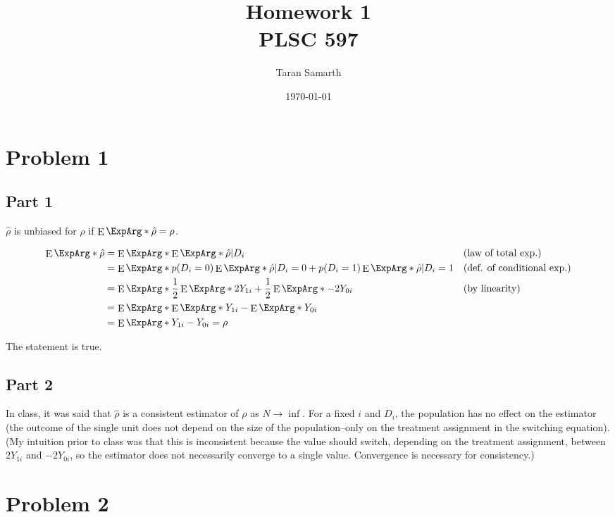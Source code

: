 \documentclass[12pt]{article}
\DeclareMathOperator{\ExpOp}{E}
\newcommand{\E}{\ExpOp\ExpArg*}
\begin{document}
\title{Homework 1 \\
        \large PLSC 597}

\author{Taran Samarth}
\date{\today}
\maketitle

\onehalfspacing

\section*{Problem 1}

\subsection*{Part 1}

$\hat{\rho}$ is unbiased for $\rho$ if $\E{\hat{\rho}} = \rho$.

\begin{align*}
\E{\hat{\rho}} & = \E{\E{\hat{\rho} | D_i}} && \text{(law of total exp.)} \\
& = \E{p(D_i = 0)\E{\hat{\rho} | D_i = 0} + p(D_i = 1)\E{\hat{\rho} | D_i = 1}} && \text{(def. of conditional exp.)}\\
& = \E{\frac{1}{2}\E{2Y_{1i}} + \frac{1}{2}\E{-2Y_{0i}}} && \text{(by linearity)} \\ 
& = \E{\E{Y_{1i}} - \E{Y_{0i}}} && \\
& = \E{Y_{1i} - Y_{0i}} = \rho &&
\end{align*}

The statement is true.

\subsection*{Part 2}

In class, it was said that $\hat{\rho}$ is a consistent estimator of $\rho$ as $N \rightarrow \inf$. For a fixed $i$ and $D_i$, the population has no effect on the estimator (the outcome of the single unit does not depend on the size of the population--only on the treatment assignment in the switching equation). (My intuition prior to class was that this is inconsistent because the value should switch, depending on the treatment assignment, between $2Y_{1i}$ and $-2Y_{0i}$, so the estimator does not necessarily converge to a single value. Convergence is necessary for consistency.)

\section*{Problem 2}
\end{document}
